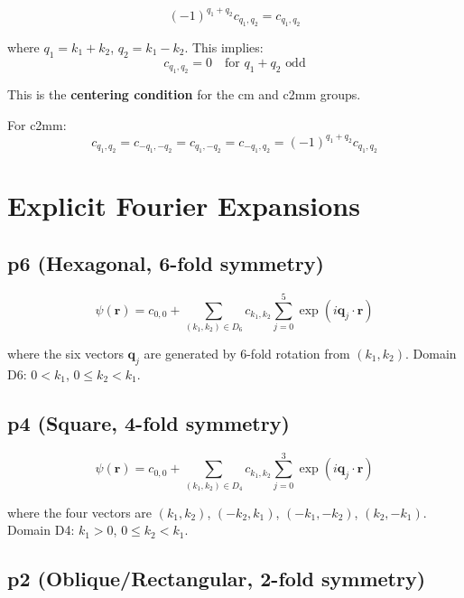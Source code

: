 \begin{equation}
    (-1)^{q_1+q_2} c_{q_1,q_2} = c_{q_1,q_2}
\end{equation}

where $q_1 = k_1+k_2$, $q_2 = k_1-k_2$. This implies:
\begin{equation}
    c_{q_1,q_2} = 0 \quad \text{for } q_1 + q_2 \text{ odd}
\end{equation}

This is the \textbf{centering condition} for the cm and c2mm groups.

For c2mm:
\begin{equation}
    c_{q_1,q_2} = c_{-q_1,-q_2} = c_{q_1,-q_2} = c_{-q_1,q_2} = (-1)^{q_1+q_2} c_{q_1,q_2}
\end{equation}

\section{Explicit Fourier Expansions}

\subsection{p6 (Hexagonal, 6-fold symmetry)}

\begin{equation}
    \psi(\boldsymbol{r}) = c_{0,0} + \sum_{(k_1,k_2) \in D_6} c_{k_1,k_2} \sum_{j=0}^{5} \exp(i \boldsymbol{q}_j \cdot \boldsymbol{r})
\end{equation}

where the six vectors $\boldsymbol{q}_j$ are generated by 6-fold rotation from $(k_1,k_2)$. Domain D6: $0 < k_1$, $0 \leq k_2 < k_1$.

\subsection{p4 (Square, 4-fold symmetry)}

\begin{equation}
    \psi(\boldsymbol{r}) = c_{0,0} + \sum_{(k_1,k_2) \in D_4} c_{k_1,k_2} \sum_{j=0}^{3} \exp(i \boldsymbol{q}_j \cdot \boldsymbol{r})
\end{equation}

where the four vectors are $(k_1,k_2)$, $(-k_2,k_1)$, $(-k_1,-k_2)$, $(k_2,-k_1)$. Domain D4: $k_1 > 0$, $0 \leq k_2 < k_1$.

\subsection{p2 (Oblique/Rectangular, 2-fold symmetry)}

